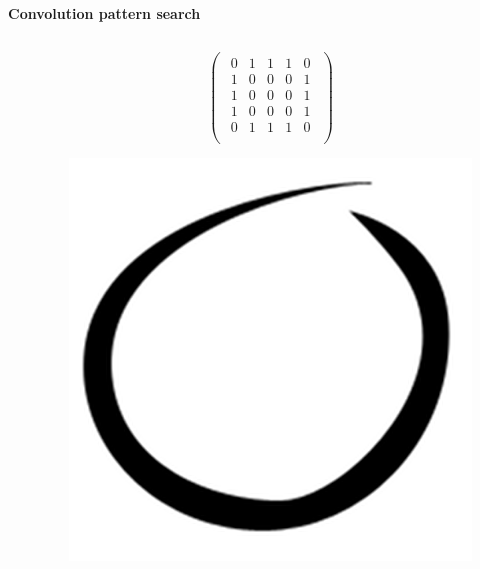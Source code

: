 \documentclass[xcolor=dvipsnames]{beamer}
\begin{document}
\begin{frame}{\bf Convolution pattern search}
\begin{columns}
\begin{column}{0.5\textwidth}
    \end{column}

    \begin{column}{0.5\textwidth}

    {\tiny
        \begin{equation*}
        \begin{pmatrix}
        \begin{array}{rrrrr}
            0  & 1 & 1 & 1 & 0\\
            1  & 0 & 0 & 0 & 1 \\
            1  & 0 & 0 & 0 & 1 \\
            1  & 0 & 0 & 0 & 1 \\
            0  & 1 & 1 & 1 & 0 \\
        \end{array}
        \end{pmatrix}
        \end{equation*}
    }

    \begin{figure}
      \includegraphics[scale=0.05]{../../diagrams/nn/o.png}
    \end{figure}

    \end{column}


\end{columns}


\end{frame}
\end{document}
